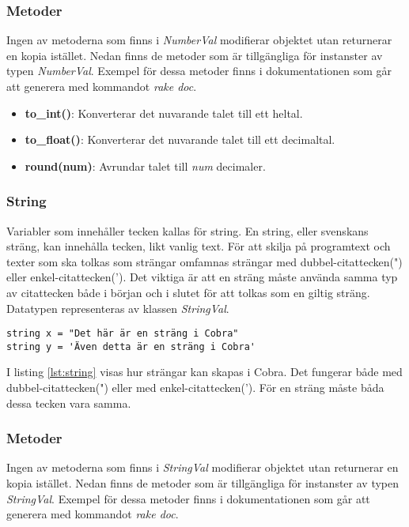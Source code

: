 \documentclass{TDP003mall}
\begin{document}
\subsubsection*{Metoder}
Ingen av metoderna som finns i \emph{NumberVal} modifierar objektet utan returnerar en kopia istället.
Nedan finns de metoder som är tillgängliga för instanster av typen \emph{NumberVal}.
Exempel för dessa metoder finns i dokumentationen som går att generera med kommandot \emph{rake doc}.

\begin{itemize}
    \item \textbf{to\_int()}: Konverterar det nuvarande talet till ett heltal.
    \item \textbf{to\_float()}: Konverterar det nuvarande talet till ett decimaltal.
    \item \textbf{round(num)}: Avrundar talet till \emph{num} decimaler.
\end{itemize}

\subsubsection{String}
Variabler som innehåller tecken kallas för string. En string, eller svenskans sträng, kan innehålla tecken, likt vanlig text. För att skilja på programtext och texter som ska tolkas som strängar omfamnas strängar med dubbel-citattecken(") eller enkel-citattecken('). Det viktiga är att en sträng måste använda samma typ av citattecken både i början och i slutet för att tolkas som en giltig sträng.
Datatypen representeras av klassen \emph{StringVal}.

\begin{lstlisting}[caption=String-exempel, label=lst:string]
string x = "Det här är en sträng i Cobra"
string y = 'Även detta är en sträng i Cobra'
\end{lstlisting}
I listing \ref{lst:string} visas hur strängar kan skapas i Cobra. Det fungerar både med dubbel-citattecken(") eller med enkel-citattecken('). För en sträng måste båda dessa tecken vara samma.

\subsubsection*{Metoder}
Ingen av metoderna som finns i \emph{StringVal} modifierar objektet utan returnerar en kopia istället.
Nedan finns de metoder som är tillgängliga för instanster av typen \emph{StringVal}.
Exempel för dessa metoder finns i dokumentationen som går att generera med kommandot \emph{rake doc}.
\end{document}
